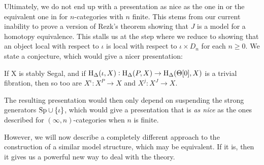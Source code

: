 Ultimately, we do not end up with a presentation as nice as the one in \cite{rezk-theta-n-spaces} or the equivalent one in \cite{ara-new} for \(n\)-categories with \(n\) finite.  This stems from our current inability to prove a version of Rezk's theorem showing that \(J\) is a model for a homotopy equivalence.  This stalls us at the step where we reduce to showing that an object local with respect to \(\iota\) is local with respect to \(\iota\times D_n\) for each \(n\geq 0\).  We state a conjecture, which would give a nicer presentation:
\begin{conj}\label{genconjecture} If X is stably Segal, and if \(\operatorname{H}_\Delta(\iota, X): \operatorname{H}_\Delta(P,X) \to \operatorname{H}_\Delta(\Theta[0], X)\) is a trivial fibration, then so too are \(X^\iota:X^P\to X\) and \(X^j:X^J\to X\).  
\end{conj}
The resulting presentation would then only depend on suspending the strong generators \({\operatorname{Sp}} \cup \{\iota\}\), which would give a presentation that is \emph{as nice} as the ones described for \((\infty,n)\)-categories when \(n\) is finite.  

However, we will now describe a completely different approach to the construction of a similar model structure, which may be equivalent.  If it is, then it gives us a powerful new way to deal with the theory.
